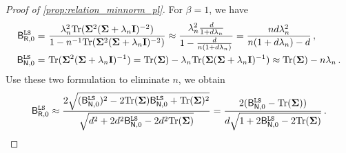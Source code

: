 \begin{proof}[Proof of \cref{prop:relation_minnorm_pl}]
For $\beta=1$, we have
\[
\begin{aligned}
    \mathsf B_{\mathsf R,0}^{\tt LS} =&~ \frac{\lambda_n^2{\rm Tr}({\boldsymbol \Sigma}^2({\boldsymbol \Sigma}+\lambda_n{\mathbf I})^{-2})}{1-n^{-1}{\rm Tr}({\boldsymbol \Sigma}^2({\boldsymbol \Sigma}+\lambda_n{\mathbf I})^{-2})} \approx \frac{\lambda_n^2\frac{d}{1+d\lambda_n}}{1-\frac{d}{n(1+d\lambda_n)}} = \frac{nd\lambda_n^2}{n(1+d\lambda_n)-d}\,,\\
    \mathsf B_{\mathsf N,0}^{\tt LS} =&~ {\rm Tr}({\boldsymbol \Sigma}^2({\boldsymbol \Sigma}+\lambda_n{\mathbf I})^{-1}) = {\rm Tr}({\boldsymbol \Sigma}) - \lambda_n{\rm Tr}({\boldsymbol \Sigma}({\boldsymbol \Sigma}+\lambda_n{\mathbf I})^{-1}) \approx {\rm Tr}({\boldsymbol \Sigma}) - n\lambda_n\,.\\
\end{aligned}
\]
Use these two formulation to eliminate $n$, we obtain
\[
\mathsf B_{\mathsf R,0}^{\tt LS} \approx \frac{2\sqrt{(\mathsf B_{\mathsf N, 0}^{\tt LS})^2-2{\rm Tr}({\boldsymbol \Sigma})\mathsf B_{\mathsf N, 0}^{\tt LS}+{\rm Tr}({\boldsymbol \Sigma})^2}}{\sqrt{d^2+2d^2\mathsf B_{\mathsf N, 0}^{\tt LS}-2d^2{\rm Tr}({\boldsymbol \Sigma})}} = \frac{2(\mathsf B_{\mathsf N, 0}^{\tt LS} - {\rm Tr}({\boldsymbol \Sigma}))}{d\sqrt{1+2\mathsf B_{\mathsf N, 0}^{\tt LS}-2{\rm Tr}({\boldsymbol \Sigma})}}\,.
\]


\end{proof}
